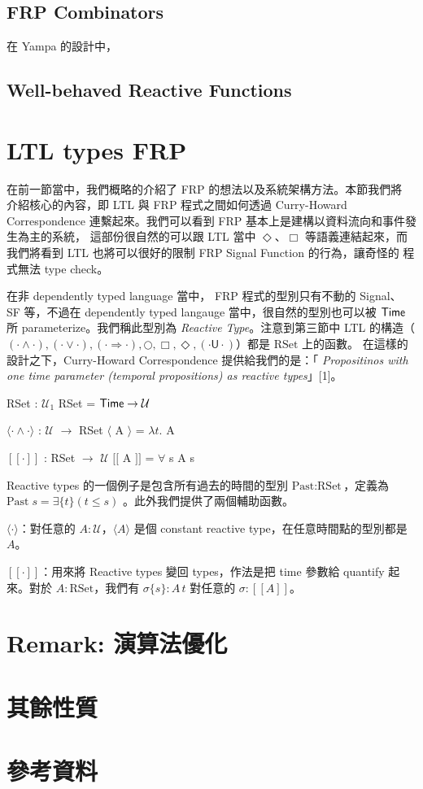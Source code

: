 \documentclass{article}
\newcommand{\llens}{[\![}
\newcommand{\rlens}{]\!]}
\newcommand{\U}{\mathcal{U}}
\newcommand{\Gs}{\sigma}
\begin{document}
  \subsection{FRP Combinators}

  在 Yampa 的設計中，

  \subsection{Well-behaved Reactive Functions}
\section{LTL types FRP}
  在前一節當中，我們概略的介紹了 FRP 的想法以及系統架構方法。本節我們將
  介紹核心的內容，即 LTL 與 FRP 程式之間如何透過 Curry-Howard Correspondence
  連繫起來。我們可以看到 FRP 基本上是建構以資料流向和事件發生為主的系統，
  這部份很自然的可以跟 LTL 當中 $\Diamond$、$\Box$ 等語義連結起來，而
  我們將看到 LTL 也將可以很好的限制 FRP Signal Function 的行為，讓奇怪的
  程式無法 type check。

  在非 dependently typed language 當中， FRP 程式的型別只有不動的 Signal、
  SF 等，不過在 dependently typed langauge 當中，很自然的型別也可以被 $\mathsf{Time}$
  所 parameterize。我們稱此型別為 \emph{Reactive Type}。注意到第三節中
  LTL 的構造（$(\cdot\land\cdot), (\cdot\lor\cdot), (\cdot\Rightarrow\cdot),\bigcirc,\Box,\Diamond,(\cdot\mathsf{U}\cdot)$）都是 $\text{RSet}$ 上的函數。
  在這樣的設計之下，Curry-Howard Correspondence 提供給我們的是：「
  \emph{Propositinos with one time parameter (temporal propositions) as reactive types}」[1]。

  \begin{code}
  RSet : $\U_1$
  RSet = $\Time\to\U$

  $\langle\cdot\land\cdot\rangle$ : $\U$ $\to$ RSet
  $\langle$ A $\rangle$ = $\lambda t.$ A

  $\llens\cdot\rlens$ : RSet $\to$ $\U$
  $\llens$ A $\rlens$ = $\forall$ {s} A s
  \end{code}

  Reactive types 的一個例子是包含所有過去的時間的型別
  $\text{Past} : \text{RSet}$，定義為 $\text{Past}\; s = \exists\{t\} (t\le s)$
  。此外我們提供了兩個輔助函數。
  \begin{enumerate*}
    \item $\langle\cdot\rangle$：對任意的 $A:\U$，$\langle A\rangle$ 是個
    constant reactive type，在任意時間點的型別都是 $A$。
    \item $\llens\cdot\rlens$：用來將 Reactive types 變回 types，作法是把
    time 參數給 quantify 起來。對於 $A:\text{RSet}$，我們有 $\Gs\{s\}:A\,t$
    對任意的 $\Gs:\llens A\rlens$。
  \end{enumerate*}

\section{Remark: 演算法優化}
\section{其餘性質}
\section{參考資料}
\end{document}
